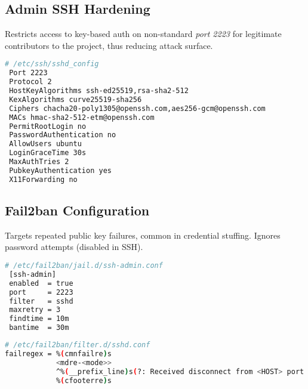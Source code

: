 \documentclass{cls/ULBreport}
\begin{document}
        
        \subsection{Admin SSH Hardening}
        Restricts access to key-based auth on non-standard \textit{port 2223} for legitimate contributors to the project, thus reducing attack surface.
        
        \begin{lstlisting}[language=bash,caption={Securing Legitimate Access}]
 # /etc/ssh/sshd_config
 Port 2223
 Protocol 2
 HostKeyAlgorithms ssh-ed25519,rsa-sha2-512
 KexAlgorithms curve25519-sha256
 Ciphers chacha20-poly1305@openssh.com,aes256-gcm@openssh.com
 MACs hmac-sha2-512-etm@openssh.com
 PermitRootLogin no
 PasswordAuthentication no
 AllowUsers ubuntu
 LoginGraceTime 30s
 MaxAuthTries 2
 PubkeyAuthentication yes
 X11Forwarding no
        \end{lstlisting}
        
        
        \subsection{Fail2ban Configuration}
        Targets repeated public key failures, common in credential stuffing. Ignores password attempts (disabled in SSH).
        
        \begin{lstlisting}[language=bash,caption={Custom Jail Rules}]
 # /etc/fail2ban/jail.d/ssh-admin.conf
 [ssh-admin]
 enabled  = true
 port     = 2223
 filter   = sshd
 maxretry = 3  
 findtime = 10m
 bantime  = 30m
        \end{lstlisting}
        
        \begin{lstlisting}[language=bash,caption={Regex Filter Against Key-Based Attacks}]
 # /etc/fail2ban/filter.d/sshd.conf
failregex = %(cmnfailre)s
            <mdre-<mode>>
            ^%(__prefix_line)s(?: Received disconnect from <HOST> port \d+: Too many authentication failures | Disconnected from <HOST> port \d+ due to: Authentication failed for .* publickey )
            %(cfooterre)s
        \end{lstlisting}
        
        
\end{document}
